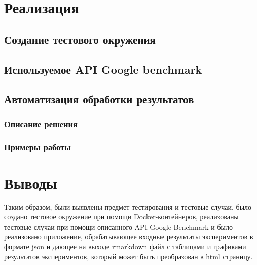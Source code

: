 \section{Реализация}
	\subsection{Создание тестового окружения}
	\label{title:chapter2:testing_environment_description}
	
	\subsection{Используемое API Google benchmark}
	\label{title:chapter2:testing_google_benchmark_api}
	
	\subsection{}

		\label{title:chapter2:mira_test_details}
		
		
	\subsection{Автоматизация обработки результатов}
	\label{title:chapter2:testing_analyser}
		\subsubsection{Описание решения}
		\label{title:chapter2:testing_analyser_description}
		
		\subsubsection{Примеры работы}
		\label{title:chapter2:analyser_examples}
		
\section{Выводы}
	Таким образом, были выявлены предмет тестирования и тестовые случаи, было создано тестовое окружение при помощи Docker-контейнеров, реализованы тестовые случаи при помощи описанного API Google Benchmark и было реализовано приложение, обрабатывающее входные результаты экспериментов в формате json и дающее на выходе rmarkdown файл с таблицами и графиками результатов экспериментов, который может быть преобразован в html страницу.

